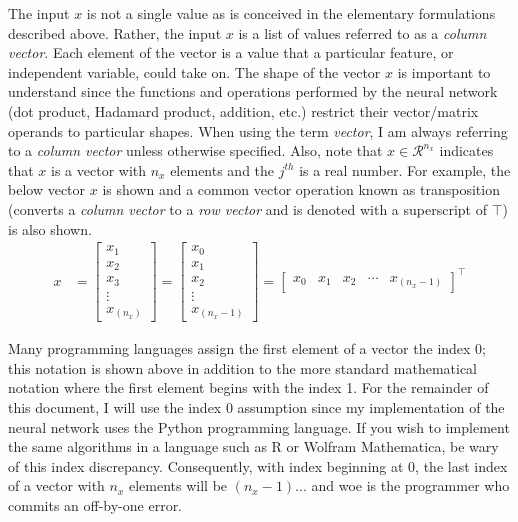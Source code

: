 \documentclass{article}
\begin{document}
The input $x$ is not a single value as is conceived in the elementary
formulations described above. Rather, the input $x$ is a list of
values referred to as a \textit{column vector}. Each element of the vector
is a value that a particular feature, or independent variable, could take on.
The shape of the vector $x$ is important to understand since the functions and operations
performed by the neural network (dot product, Hadamard product, addition, etc.)
restrict their vector/matrix operands to particular shapes. When using the term
\textit{vector}, I am always referring to a \textit{column vector}
unless otherwise specified. Also, note that $x \in \mathcal{R}^{n_x}$ indicates
that $x$ is a vector with $n_x$ elements and the $j^{th}$ is a real number.
For example, the below vector $x$ is shown and a common vector operation
known as transposition (converts a \textit{column vector} to a
\textit{row vector} and is denoted with a superscript of $\top$) is also shown.
\begin{align}
	x & = \begin{bmatrix}
		x_{1}  \\
		x_{2}  \\
		x_{3}  \\
		\vdots \\
		x_{(n_x)}
	\end{bmatrix}
	=
	\begin{bmatrix}
		x_{0}  \\
		x_{1}  \\
		x_{2}  \\
		\vdots \\
		x_{(n_{x}-1)}
	\end{bmatrix}
	=
	\begin{bmatrix}
		x_{0} & x_{1} & x_{2} & \cdots & x_{(n_{x}-1)}
	\end{bmatrix}^\top
\end{align}

Many programming languages assign the first element of a vector the index
0; this notation is shown above in addition to the more standard
mathematical notation where the first element begins with the index 1.
For the remainder of this document, I will use the index 0 assumption
since my implementation of the neural network uses the Python
programming language. If you wish to implement the same algorithms in a language
such as R or Wolfram Mathematica, be wary of this index discrepancy.
Consequently, with index beginning at 0, the last index of a vector with
$n_x$ elements will be $(n_x - 1)$... and woe is the programmer who commits an
off-by-one error.
\end{document}
